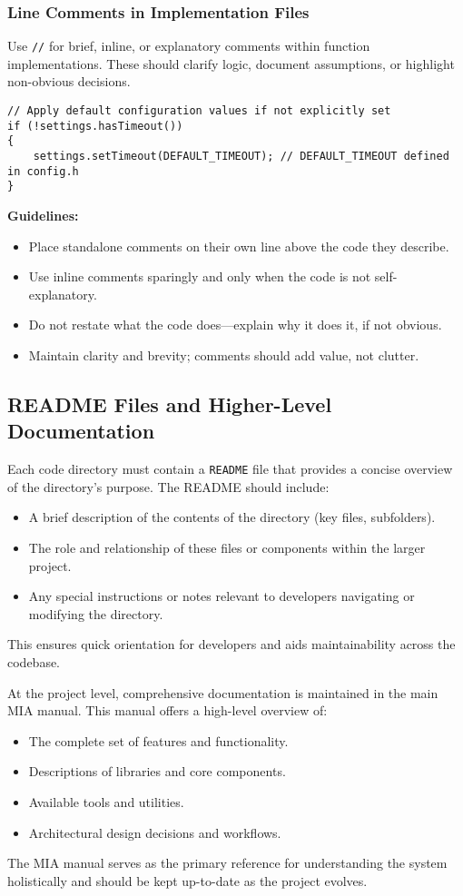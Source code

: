 \subsubsection*{Line Comments in Implementation Files}

Use \texttt{//} for brief, inline, or explanatory comments within function implementations. These should clarify logic, document assumptions, or highlight non-obvious decisions.
\begin{lstlisting}[style=cppstyle]
// Apply default configuration values if not explicitly set
if (!settings.hasTimeout()) 
{
    settings.setTimeout(DEFAULT_TIMEOUT); // DEFAULT_TIMEOUT defined in config.h
}
\end{lstlisting}
\textbf{Guidelines:}
\begin{itemize}
    \item Place standalone comments on their own line above the code they describe.
    \item Use inline comments sparingly and only when the code is not self-explanatory.
    \item Do not restate what the code does—explain why it does it, if not obvious.
    \item Maintain clarity and brevity; comments should add value, not clutter.
\end{itemize}



\subsection{README Files and Higher-Level Documentation}

Each code directory must contain a \texttt{README} file that provides a concise overview of the directory’s purpose. The README should include:
\begin{itemize}
    \item A brief description of the contents of the directory (key files, subfolders).
    \item The role and relationship of these files or components within the larger project.
    \item Any special instructions or notes relevant to developers navigating or modifying the directory.
\end{itemize}
This ensures quick orientation for developers and aids maintainability across the codebase.

At the project level, comprehensive documentation is maintained in the main MIA manual. This manual offers a high-level overview of:
\begin{itemize}
    \item The complete set of features and functionality.
    \item Descriptions of libraries and core components.
    \item Available tools and utilities.
    \item Architectural design decisions and workflows.
\end{itemize}
The MIA manual serves as the primary reference for understanding the system holistically and should be kept up-to-date as the project evolves.

